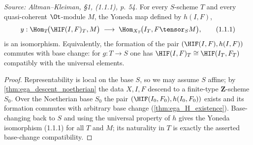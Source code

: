 \begin{theorem}
  \label{thm:H_represents}
  \textit{Source: Altman--Kleiman, §1, (1.1.1), p. 54.}
  For every $S$-scheme $T$ and every quasi-coherent $\Ot$-module $M$, the Yoneda
  map defined by $h(I,F)$,
  \[
    y : \Hom_T\!\big(\HIF(I,F)_T, M\big) \;\longrightarrow\;
        \Hom_{X_T}\!\big(I_T, F \tensor_S M\big),
        \tag{1.1.1}
  \]
  is an isomorphism. Equivalently, the formation of the pair $(\HIF(I,F), h(I,F))$
  commutes with base change: for $g : T \to S$ one has
  $\HIF(I,F)_T \cong \HIF(I_T, F_T)$ compatibly with the universal elements.
  \begin{proof}\leanok
    Representability is local on the base $S$, so we may assume $S$ affine; by
    \cref{thm:ega_descent_noetherian} the data $X, I, F$ descend to a finite-type
    $\mathbf{Z}$-scheme $S_0$. Over the Noetherian base $S_0$ the pair
    $(\HIF(I_0, F_0), h(I_0,F_0))$ exists and its formation commutes with
    arbitrary base change (\cref{thm:ega_H_existence}). Base-changing back to $S$
    and using the universal property of $h$ gives the Yoneda isomorphism
    \textnormal{(1.1.1)} for all $T$ and $M$; its naturality in $T$ is exactly the
    asserted base-change compatibility.
  \end{proof}
\end{theorem}

